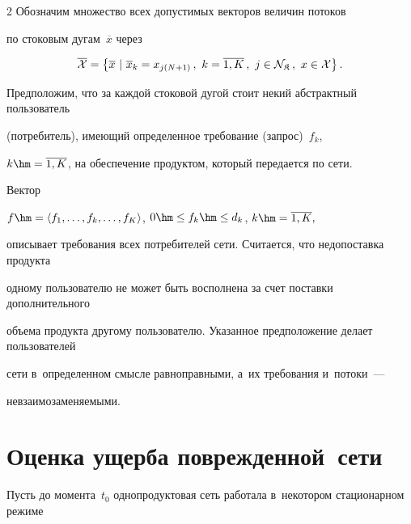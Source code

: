 \begin{multicols}{2}
Обозначим множество всех допустимых векторов величин потоков 


по стоковым дугам~$\overline x$ через


\begin{equation*}


\overline{\cal X} = \left\{ \overline x \ | \ \overline x_{k} = 


x_{j (N+1)}\,, \ k = \overline{1, K}\,, \  j \in 


{\cal N}_\SK\,, \  x \in {\cal X} \right\}. 




\end{equation*}





Предположим, что за каждой стоковой дугой стоит некий абстрактный пользователь 


(потребитель), имеющий определенное требование (запрос)~$f_k$, 


$k \hm= \overline{1, K}$, на обеспечение продуктом, который передается по сети. 


Вектор


$ f \hm= \langle f_{1}, \ldots, f_{k}, \ldots, f_{K}\rangle$, $0 \hm\le f_{k} \hm\le 


d_k$, $k \hm= \overline{1, K},$


описывает требования всех потребителей сети.  Считается, что недопоставка продукта 


одному пользователю не может быть восполнена за счет поставки дополнительного 


объема продукта другому пользователю. Указанное предположение делает пользователей 


сети в~определенном смысле равноправными, а~их требования и~потоки~--- 


невзаимозаменяемыми. 





\vspace*{-9pt}





\section{Оценка ущерба поврежденной~сети}





Пусть до момента~$t_0$ однопродуктовая сеть работала в~некотором стационарном режиме 



\end{multicols}
